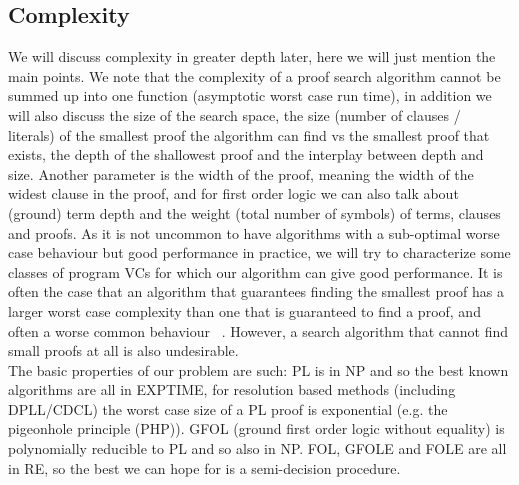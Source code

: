 \subsection*{Complexity}
\noindent
We will discuss complexity in greater depth later, here we will just mention the main points.
We note that the complexity of a proof search algorithm cannot be summed up into one function (asymptotic worst case run time), 
in addition we will also discuss the size of the search space, the size (number of clauses / literals) of the smallest proof the algorithm can find vs the smallest proof that exists, the depth of the shallowest proof and the interplay between depth and size.
Another parameter is the width of the proof, meaning the width of the widest clause in the proof, and for first order logic we can also talk about (ground) term depth and the weight (total number of symbols) of terms, clauses and proofs.
As it is not uncommon to have algorithms with a sub-optimal worse case behaviour but good performance in practice, we will try to characterize some classes of program VCs for which our algorithm can give good performance.
It is often the case that an algorithm that guarantees finding the smallest proof has a larger worst case complexity than one that is guaranteed to find a proof, and often a worse common behaviour ~\cite{}. However, a search algorithm that cannot find small proofs at all is also undesirable.\\
The basic properties of our problem are such: PL is in NP and so the best known algorithms are all in EXPTIME, for resolution based methods (including DPLL/CDCL) the worst case size of a PL proof is exponential (e.g. the pigeonhole principle (PHP)). GFOL (ground first order logic without equality) is polynomially reducible to PL and so also in NP. 
FOL, GFOLE and FOLE are all in RE, so the best we can hope for is a semi-decision procedure.

